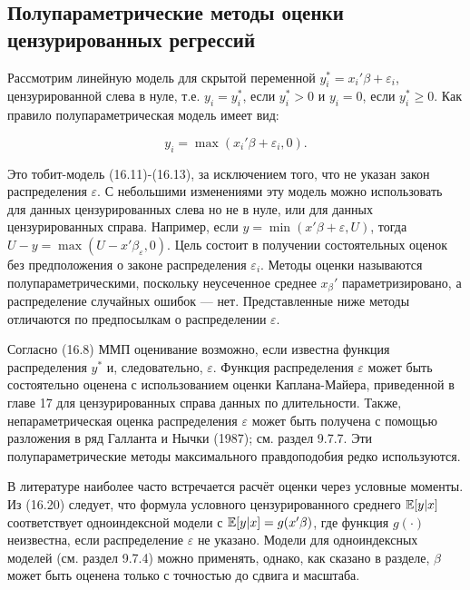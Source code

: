 \subsection{Полупараметрические методы оценки цензурированных регрессий}


Рассмотрим линейную модель для скрытой переменной $y_i^{*}=x_i'\beta+\varepsilon_i$, цензурированной слева  в нуле, т.е. $y_i=y_i^{*}$, если $y_i^{*}>0$ и $y_i=0$, если $y_i^{*}{\geq}0$. Как правило полупараметрическая модель имеет вид:

\begin{equation}
y_i=\max(x_i'\beta+\varepsilon_i,0).
\end{equation}

Это тобит-модель (16.11)-(16.13), за исключением того, что не указан закон распределения $\varepsilon$. С небольшими изменениями эту модель можно использовать для данных цензурированных слева но не в нуле, или для данных цензурированных справа. Например, если $y=\min(x'\beta+\varepsilon,U)$, тогда $U-y=\max(U-x'\beta_\varepsilon,0)$. Цель состоит в получении состоятельных оценок без предположения о законе распределения $\varepsilon_i$. Методы оценки называются полупараметрическими, поскольку неусеченное среднее $x_\beta'$ параметризировано, а распределение случайных ошибок --- нет. Представленные ниже методы отличаются по предпосылкам о распределении $\varepsilon$. 

Согласно (16.8) ММП оценивание возможно, если известна функция  распределения $y^* $ и, следовательно, $\varepsilon$. Функция распределения $\varepsilon$ может быть состоятельно оценена с использованием оценки Каплана-Майера, приведенной в главе 17  для цензурированных справа данных по длительности. Также, непараметрическая оценка распределения $\varepsilon$ может быть получена с помощью  разложения в ряд Галланта и Нычки (1987); см. раздел 9.7.7. Эти полупараметрические методы максимального правдоподобия редко используются.

В литературе наиболее часто встречается расчёт оценки через условные моменты. Из (16.20) следует, что формула условного цензурированного среднего $\mathbb{E}[y|x]$ соответствует одноиндексной модели с $\mathbb{E}[y|x]=g(x'\beta)$, где функция $g(\cdot )$ неизвестна, если распределение $\varepsilon$ не указано. Модели для одноиндексных моделей  (см. раздел 9.7.4) можно применять, однако, как сказано в разделе, $\beta$ может быть оценена только с точностью до сдвига и масштаба. 

